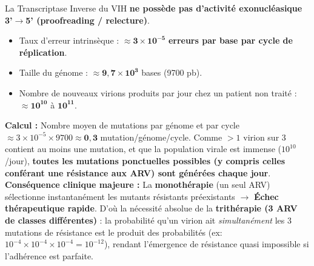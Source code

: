 \documentclass[11pt]{article}
\begin{document}
\begin{exemplebox}
La Transcriptase Inverse du VIH \textbf{ne possède pas d'activité exonucléasique 3'$\rightarrow$5' (proofreading / relecture)}.
\begin{itemize}
    \item Taux d'erreur intrinsèque : $\approx \mathbf{3 \times 10^{-5}}$ \textbf{erreurs par base par cycle de réplication}.
    \item Taille du génome : $\approx \mathbf{9,7 \times 10^3}$ bases (\num{9700} pb).
    \item Nombre de nouveaux virions produits par jour chez un patient non traité : $\approx \mathbf{10^{10}}$ à $\mathbf{10^{11}}$.
\end{itemize}
\textbf{Calcul :} Nombre moyen de mutations par génome et par cycle $\approx 3 \times 10^{-5} \times 9700 \approx \mathbf{0,3}$ mutation/génome/cycle.
Comme $> 1$ virion sur 3 contient au moins une mutation, et que la population virale est immense ($10^{10}$/jour), \textbf{toutes les mutations ponctuelles possibles (y compris celles conférant une résistance aux ARV) sont générées chaque jour}.
\textbf{Conséquence clinique majeure :} La \textbf{monothérapie} (un seul ARV) sélectionne instantanément les mutants résistants préexistants $\rightarrow$ \textbf{Échec thérapeutique rapide}. D'où la nécessité absolue de la \textbf{trithérapie (3 ARV de classes différentes)} : la probabilité qu'un virion ait \emph{simultanément} les 3 mutations de résistance est le produit des probabilités (ex: $10^{-4} \times 10^{-4} \times 10^{-4} = 10^{-12}$), rendant l'émergence de résistance quasi impossible si l'adhérence est parfaite.
\end{exemplebox}
\end{document}
